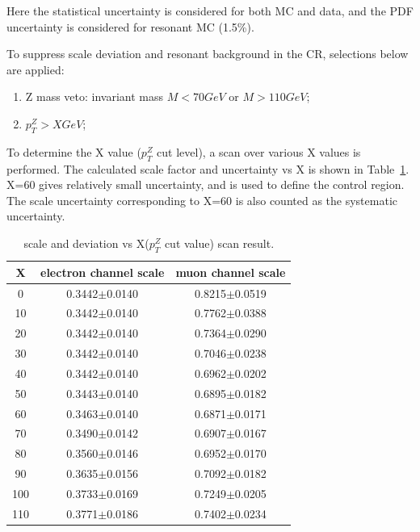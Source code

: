 Here the statistical uncertainty is considered for both MC and data, and the PDF uncertainty is considered for resonant MC (1.5\%).

\vspace{0.3cm}
To suppress scale deviation and resonant background in the CR, selections below are applied: 
\begin{enumerate}
\item Z mass veto: invariant mass $M<70GeV$ or $M>110GeV$; 
\item $p_{T}^{Z} > X GeV$;
\end{enumerate}

To determine the X value ($p_{T}^{Z}$ cut level), a scan over various X values is performed. The calculated scale factor and uncertainty vs X is shown in Table~\ref{tab:nonressfdev}. X=60 gives relatively small uncertainty, and is used to define the control region. The scale uncertainty corresponding to X=60 is also counted as the systematic uncertainty.

\begin{table}[htbp]
  \begin{center}
    \caption{
      scale and deviation vs X($p_{T}^{Z}$ cut value) scan result.      
      \label{tab:nonressfdev}}
    \begin{tabular}{c c c}
      \hline\hline
      X & electron channel scale & muon channel scale\\
      \hline
      0  & 0.3442$\pm$0.0140 & 0.8215$\pm$0.0519 \\
      10 & 0.3442$\pm$0.0140 & 0.7762$\pm$0.0388 \\
      20 & 0.3442$\pm$0.0140 & 0.7364$\pm$0.0290 \\
      30 & 0.3442$\pm$0.0140 & 0.7046$\pm$0.0238 \\
      40 & 0.3442$\pm$0.0140 & 0.6962$\pm$0.0202 \\
      50 & 0.3443$\pm$0.0140 & 0.6895$\pm$0.0182 \\
      60 & 0.3463$\pm$0.0140 & 0.6871$\pm$0.0171 \\
      70 & 0.3490$\pm$0.0142 & 0.6907$\pm$0.0167 \\
      80 & 0.3560$\pm$0.0146 & 0.6952$\pm$0.0170 \\
      90 & 0.3635$\pm$0.0156 & 0.7092$\pm$0.0182 \\
      100 & 0.3733$\pm$0.0169 & 0.7249$\pm$0.0205 \\
      110 & 0.3771$\pm$0.0186 & 0.7402$\pm$0.0234 \\
      \hline\hline
    \end{tabular}
  \end{center}
\end{table}

